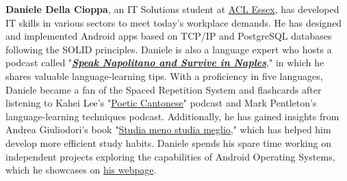%
%

\textbf{Daniele Della Cioppa}, an IT Solutions student at \href{https://aclessex.com/about-us/}{ACL Essex}, has developed IT skills in various sectors to meet today's workplace demands. He has designed and implemented Android apps based on TCP/IP and PostgreSQL databases following the SOLID principles. Daniele is also a language expert who hosts a podcast called "\textbf{\emph{\href{https://open.spotify.com/show/05U0mbJEdy1PtqnXOTFHAR}{Speak Napolitano and Survive in Naples}}}," in which he shares valuable language-learning tips. With a proficiency in five languages, Daniele became a fan of the Spaced Repetition System and flashcards after listening to Kahei Lee's "\href{https://www.poeticcantonese.com/}{Poetic Cantonese}" podcast and Mark Pentleton's language-learning techniques podcast. Additionally, he has gained insights from Andrea Giuliodori's book "\href{https://www.efficacemente.com/}{Studia meno studia meglio}," which has helped him develop more efficient study habits. Daniele spends his spare time working on independent projects exploring the capabilities of Android Operating Systems, which he showcases on \href{https://danieledellacioppa.github.io/}{his webpage}.
